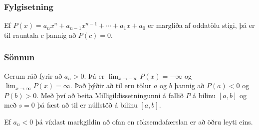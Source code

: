 \documentclass[icelandic,a4paper,12pt]{article}
\begin{document}
\subsubsection{Fylgisetning}
Ef $P(x)=a_nx^n+a_{n-1}x^{n-1}+\cdots+a_1x+a_0$ er margliða af
oddatölu stigi, þá er til rauntala $c$ þannig að $P(c)=0$.

\subsubsection{Sönnun}
Gerum ráð fyrir að $a_n>0$.
Þá er $\lim_{x\to -\infty} P(x) = -\infty$ og
$\lim_{x\to \infty} P(x) = \infty$.
Það þýðir að til eru tölur $a$ og $b$ 
þannig að $P(a)<0$ og $P(b)>0$.
Með því að beita Milligildissetningunni á fallið $P$ á 
bilinu $[a,b]$ og með $s=0$ þá fæst að til er núllstöð 
á bilinu $[a,b]$.
	
Ef $a_n < 0$ þá víxlast markgildin að ofan en röksemdafærslan er
að öðru leyti eins.
\end{document}
